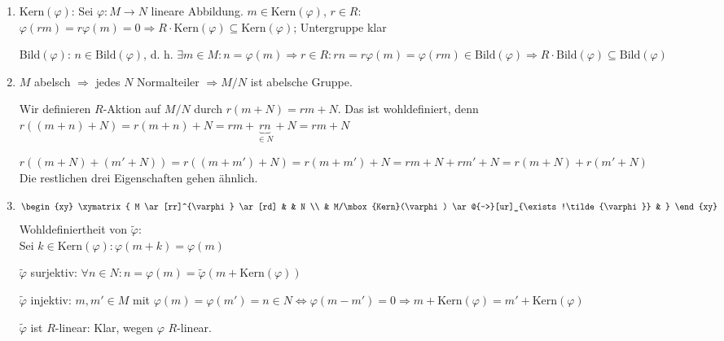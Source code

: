 \begin{Bew}
  \begin{enumerate}
    \item Kern$(\varphi)$: Sei $\varphi: M \rightarrow N$ lineare Abbildung. $m \in \mbox{Kern} (\varphi)$, $r \in R$:\\
          $\varphi(rm) = r\varphi(m) = 0 \Rightarrow R \cdot \mbox{Kern} (
          \varphi ) \subseteq \mbox{Kern} (\varphi)$; Untergruppe klar

	  Bild$(\varphi)$: $n \in \mbox{Bild} (\varphi) $, d. h. $\exists m\in M: n =
	  \varphi (m) \Rightarrow r \in R:
	  rn = r \varphi(m) = \varphi(rm) \in \mbox{Bild} (\varphi)  \Rightarrow R
	  \cdot \mbox{Bild} (\varphi) \subseteq \mbox{Bild} (\varphi)$
    \item $M$ abelsch $\Rightarrow$ jedes $N$ Normalteiler $\Rightarrow M/N$ ist
          abelsche Gruppe.

    	  Wir definieren $R$-Aktion auf $M/N$ durch $r(m + N) = rm + N$. Das ist 
    	  wohldefiniert, denn\\
	  $r((m+n)+N)=r(m+n) + N= rm + \underbrace{rn}_{\in N} + N = rm + N$

	  $r((m+N) + (m' + N ) ) = r((m+m')+N) = r(m+m') + N = rm + N + rm' + N =
	  r(m+N) + r(m'+N)$\\
	  Die restlichen drei Eigenschaften gehen ähnlich.
	  
    \item
	$$\begin{xy}
              \xymatrix{
                M \ar[rr]^{\varphi} \ar[rd] &     &  N \\
                                            &  M/\mbox{Kern}(\varphi) \ar@{-->}[ur]_{\exists!\tilde{\varphi}}  & }
          \end{xy}$$
	  Wohldefiniertheit von $\tilde{\varphi}$:\\
	  Sei $k \in \textrm{Kern}(\varphi): \varphi(m+k) = \varphi(m)$

	  $\tilde{\varphi}$ surjektiv: $\forall n \in N: n = \varphi(m) =
	  \tilde{\varphi}(m+ \mbox{Kern}(\varphi))$

	  $\tilde{\varphi}$ injektiv: $m, m' \in M$ mit $\varphi(m) = \varphi(m') = n
	  \in N \Leftrightarrow 
	  \varphi(m-m') = 0 \Rightarrow m + \mbox{Kern}(\varphi) = 
	  m' + \mbox{Kern}(\varphi)$

	  $\tilde{\varphi}$ ist $R$-linear: Klar, wegen $\varphi$ $R$-linear.
  \end{enumerate}
\end{Bew}

